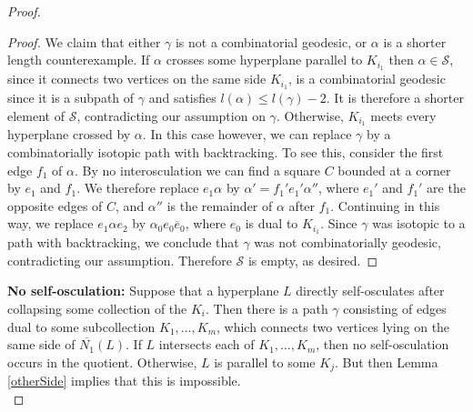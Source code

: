 \documentclass[11pt]{amsart}
\numberwithin{thm}{section}
\theoremstyle{remark}
\theoremstyle{definition}
\newcommand{\overl}[1]{\overline{#1}}
\begin{document}
\begin{proof}
\begin{proof}
We claim that either $\gamma$ is not a combinatorial geodesic, or $\alpha$ is a shorter length counterexample.  If $\alpha$ crosses some hyperplane parallel to $K_{i_1}$ then $\alpha\in \mathcal{S}$, since it connects two vertices on the same side $K_{i_1}$, is a combinatorial geodesic since it is a subpath of $\gamma$ and satisfies $l(\alpha)\leq l(\gamma)-2$.  It is therefore a shorter element of $\mathcal{S}$, contradicting our assumption on $\gamma$.  Otherwise, $K_{i_1}$ meets every hyperplane crossed by $\alpha$.  In this case however, we can replace $\gamma$ by a combinatorially isotopic path with backtracking.  To see this, consider the first edge $f_1$ of $\alpha$.  By no interosculation we can find a square $C$ bounded at a corner by $e_1$ and $f_1$.  We therefore replace $e_1\alpha$ by $\alpha'=f_1'e_1'\alpha''$, where $e_1'$ and $f_1'$ are the opposite edges of $C$, and $\alpha''$ is the remainder of $\alpha$ after $f_1$.  Continuing in this way, we replace $e_1\alpha e_2$ by $\alpha_0 e_0\overl{e}_0$, where $e_0$ is dual to $K_{i_1}$. Since $\gamma$ was isotopic to a path with backtracking, we conclude that $\gamma$ was not combinatorially geodesic, contradicting our assumption.  Therefore $\mathcal{S}$ is empty, as desired. 
%
%
%
%
\end{proof}
\noindent
\textbf{No self-osculation:} Suppose that a hyperplane $L$ directly self-osculates after collapsing some collection of the $K_i$.  Then there is a path $\gamma$ consisting of edges dual to some subcollection $K_1,\ldots, K_m$, which connects two vertices lying on the same side of $\overl{N_1}(L)$.  If $L$ intersects each of $K_1,\ldots, K_m$, then no self-osculation occurs in the quotient.  Otherwise, $L$ is parallel to some $K_j$.  But then Lemma \ref{otherSide} implies that this is impossible.  \\



\end{proof}
\end{document}
